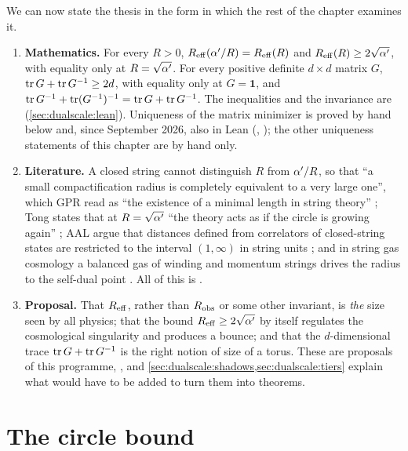 We can now state the thesis in the form in which the rest of the chapter examines it.

\begin{enumerate}[leftmargin=*]
\item[(A)] \textbf{Mathematics.} For every $R>0$, $R_{\rm eff}(\alpha'/R)=R_{\rm eff}(R)$ and
 $R_{\rm eff}(R)\ge2\sqrt{\alpha'}$, with equality only at $R=\sqrt{\alpha'}$. For every positive
 definite $d\times d$ matrix $G$, $\operatorname{tr} G+\operatorname{tr} G^{-1}\ge2d$, with equality only at $G=\mathbf1$,
 and $\operatorname{tr} G^{-1}+\operatorname{tr}(G^{-1})^{-1}=\operatorname{tr} G+\operatorname{tr} G^{-1}$. The inequalities and the invariance are
 \TA{} (\cref{sec:dualscale:lean}). Uniqueness of the matrix minimizer is proved by hand below and,
 since September 2026, also in Lean (, \TA); the other uniqueness statements
 of this chapter are by hand only.
\item[(L)] \textbf{Literature.} A closed string cannot distinguish $R$ from $\alpha'/R$, so that
 ``a small compactification radius is completely equivalent to a very large one'', which GPR
 read as ``the existence of a minimal length in string theory'' ; Tong states that at $R=\sqrt{\alpha'}$ ``the theory acts as if the circle is
 growing again'' ; AAL argue that distances defined from
 correlators of closed-string states are restricted to the interval $(1,\infty)$ in string
 units ; and in string gas cosmology a balanced gas of winding
 and momentum strings drives the radius to the self-dual point . All of this is \TL.
\item[(C)] \textbf{Proposal.} That $R_{\rm eff}$, rather than $R_{\rm obs}$ or some other
 invariant, is \emph{the} size seen by all physics; that the bound $R_{\rm eff}\ge2\sqrt{\alpha'}$
 by itself regulates the cosmological singularity and produces a bounce; and that the
 $d$-dimensional trace $\operatorname{tr} G+\operatorname{tr} G^{-1}$ is the right notion of size of a torus. These are
 proposals of this programme, \TC, and \cref{sec:dualscale:shadows,sec:dualscale:tiers} explain
 what would have to be added to turn them into theorems.
\end{enumerate}

\section{The circle bound}\label{sec:dualscale:circle}


